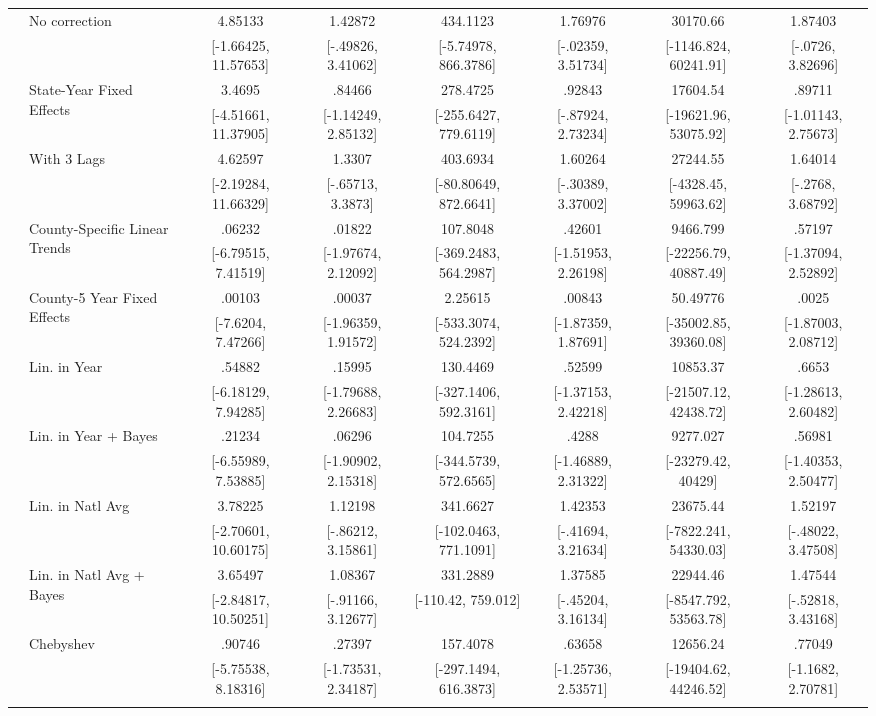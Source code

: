 \begin{landscape}
\begin{table}[htb]
\begin{threeparttable}
{\begin{tabular}{llcccccc}
  & \multirow{2}{*}{No correction} & 4.85133 & 1.42872 & 434.1123 & 1.76976 & 30170.66 & 1.87403 \\  & & [-1.66425, 11.57653] & [-.49826, 3.41062] & [-5.74978, 866.3786] & [-.02359, 3.51734] & [-1146.824, 60241.91] & [-.0726, 3.82696] \\  & \multirow{2}{*}{State-Year Fixed Effects} & 3.4695 & .84466 & 278.4725 & .92843 & 17604.54 & .89711 \\  & & [-4.51661, 11.37905] & [-1.14249, 2.85132] & [-255.6427, 779.6119] & [-.87924, 2.73234] & [-19621.96, 53075.92] & [-1.01143, 2.75673] \\  & \multirow{2}{*}{With 3 Lags} & 4.62597 & 1.3307 & 403.6934 & 1.60264 & 27244.55 & 1.64014 \\  & & [-2.19284, 11.66329] & [-.65713, 3.3873] & [-80.80649, 872.6641] & [-.30389, 3.37002] & [-4328.45, 59963.62] & [-.2768, 3.68792] \\  & \multirow{2}{*}{County-Specific Linear Trends} & .06232 & .01822 & 107.8048 & .42601 & 9466.799 & .57197 \\  & & [-6.79515, 7.41519] & [-1.97674, 2.12092] & [-369.2483, 564.2987] & [-1.51953, 2.26198] & [-22256.79, 40887.49] & [-1.37094, 2.52892] \\  & \multirow{2}{*}{County-5 Year Fixed Effects} & .00103 & .00037 & 2.25615 & .00843 & 50.49776 & .0025 \\  & & [-7.6204, 7.47266] & [-1.96359, 1.91572] & [-533.3074, 524.2392] & [-1.87359, 1.87691] & [-35002.85, 39360.08] & [-1.87003, 2.08712] \\  & \multirow{2}{*}{Lin. in Year} & .54882 & .15995 & 130.4469 & .52599 & 10853.37 & .6653 \\  & & [-6.18129, 7.94285] & [-1.79688, 2.26683] & [-327.1406, 592.3161] & [-1.37153, 2.42218] & [-21507.12, 42438.72] & [-1.28613, 2.60482] \\  & \multirow{2}{*}{Lin. in Year + Bayes} & .21234 & .06296 & 104.7255 & .4288 & 9277.027 & .56981 \\  & & [-6.55989, 7.53885] & [-1.90902, 2.15318] & [-344.5739, 572.6565] & [-1.46889, 2.31322] & [-23279.42, 40429] & [-1.40353, 2.50477] \\  & \multirow{2}{*}{Lin. in Natl Avg} & 3.78225 & 1.12198 & 341.6627 & 1.42353 & 23675.44 & 1.52197 \\  & & [-2.70601, 10.60175] & [-.86212, 3.15861] & [-102.0463, 771.1091] & [-.41694, 3.21634] & [-7822.241, 54330.03] & [-.48022, 3.47508] \\  & \multirow{2}{*}{Lin. in Natl Avg + Bayes} & 3.65497 & 1.08367 & 331.2889 & 1.37585 & 22944.46 & 1.47544 \\  & & [-2.84817, 10.50251] & [-.91166, 3.12677] & [-110.42, 759.012] & [-.45204, 3.16134] & [-8547.792, 53563.78] & [-.52818, 3.43168] \\  & \multirow{2}{*}{Chebyshev} & .90746 & .27397 & 157.4078 & .63658 & 12656.24 & .77049 \\  & & [-5.75538, 8.18316] & [-1.73531, 2.34187] & [-297.1494, 616.3873] & [-1.25736, 2.53571] & [-19404.62, 44246.52] & [-1.1682, 2.70781] \\  & 
\end{tabular}}
\end{threeparttable}
\end{table}
\end{landscape}
